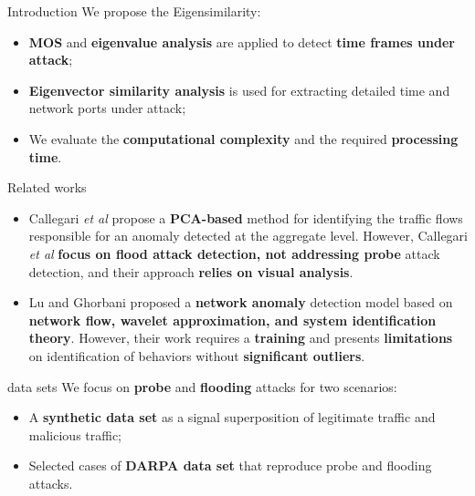 \documentclass[newPxFont, numfooter, sectionpages]{beamer}
\begin{document}
\begin{frame}[c]{Introduction}
    We propose the Eigensimilarity:
	\begin{itemize}
		\item \textbf{MOS} and \textbf{eigenvalue analysis} are applied to detect \textbf{time frames under attack};
		\item \textbf{Eigenvector similarity analysis} is used for extracting detailed time and network ports under attack;
		\item We evaluate the \textbf{computational complexity} and the required \textbf{processing time}.
	\end{itemize}
\end{frame}

\begin{frame}[c]{Related works}
	\begin{itemize}
		\item Callegari \emph{et al} \cite{Zonglin2009} propose a \textbf{PCA-based} method for identifying the traffic flows responsible for an anomaly detected at the aggregate level. However, Callegari \emph{et al} \textbf{focus on flood attack detection, not addressing probe} attack detection, and their approach \textbf{relies on visual analysis}.
		\item Lu and Ghorbani \cite{Lu2009} proposed a \textbf{network anomaly} detection model based on \textbf{network flow, wavelet approximation, and system identification theory}. However, their work requires a \textbf{training} and presents \textbf{limitations} on identification of behaviors without \textbf{significant outliers}.
	\end{itemize}
\end{frame}


\begin{frame}{data sets}
	We focus on \textbf{probe} and \textbf{flooding} attacks for two scenarios: 
	\begin{itemize}
		\item A \textbf{synthetic data set} as a signal superposition of legitimate traffic and malicious traffic;
		\item Selected cases of \textbf{DARPA data set} that reproduce probe and flooding attacks.
	\end{itemize}
\end{frame}
\end{document}
